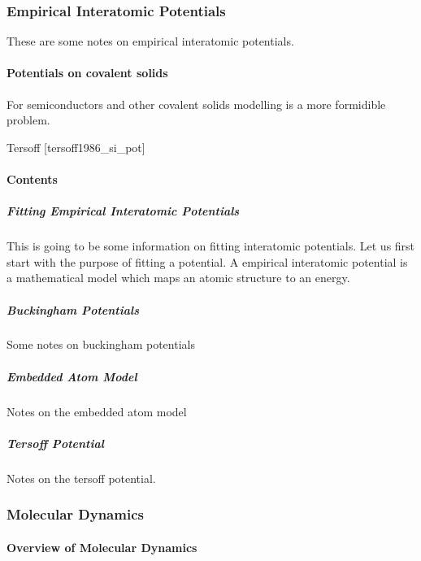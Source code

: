 \documentclass[letterpaper,10pt,english]{sphinxmanual}
\begin{document}
\subsubsection{Empirical Interatomic Potentials}
\label{\detokenize{eip/index:empirical-interatomic-potentials}}\label{\detokenize{eip/index::doc}}
These are some notes on empirical interatomic potentials.


\paragraph{Potentials on covalent solids}
\label{\detokenize{eip/index:potentials-on-covalent-solids}}
For semiconductors and other covalent solids modelling is a more formidible problem.

Tersoff {[}tersoff1986\_si\_pot{]}


\paragraph{Contents}
\label{\detokenize{eip/index:contents}}

\subparagraph{Fitting Empirical Interatomic Potentials}
\label{\detokenize{eip/fitting:fitting-empirical-interatomic-potentials}}\label{\detokenize{eip/fitting::doc}}
This is going to be some information on fitting interatomic potentials.  Let us first start with the purpose of fitting a potential.  A empirical interatomic potential is a mathematical model which maps an atomic structure to an energy.


\subparagraph{Buckingham Potentials}
\label{\detokenize{eip/buckingham:buckingham-potentials}}\label{\detokenize{eip/buckingham::doc}}
Some notes on buckingham potentials


\subparagraph{Embedded Atom Model}
\label{\detokenize{eip/eam:embedded-atom-model}}\label{\detokenize{eip/eam::doc}}
Notes on the embedded atom model


\subparagraph{Tersoff Potential}
\label{\detokenize{eip/tersoff:tersoff-potential}}\label{\detokenize{eip/tersoff::doc}}
Notes on the tersoff potential.


\subsubsection{Molecular Dynamics}
\label{\detokenize{md/index:molecular-dynamics}}\label{\detokenize{md/index:md}}\label{\detokenize{md/index::doc}}

\paragraph{Overview of Molecular Dynamics}
\label{\detokenize{md/index:overview-of-molecular-dynamics}}
\end{document}
